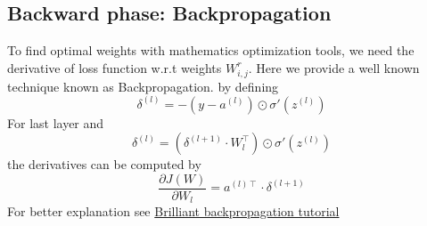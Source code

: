 \documentclass[10pt]{SelfArx} %
\begin{document}
	\subsection{Backward phase: Backpropagation}
	To find optimal weights with mathematics optimization tools, we need the derivative of loss function w.r.t weights $W_{i,j}^r$. Here we provide a well known technique known as Backpropagation.
	by defining
	\begin{equation}
	\delta^{(l)} = -(y - a^{(l)})\odot\sigma'(z^{(l)})
	\end{equation}
	For last layer and 
	\begin{equation}
	\delta^{(l)} = (\delta^{(l + 1)} \cdot W_{l}^{\intercal})\odot\sigma'(z^{(l)})
	\end{equation}
	the derivatives can be computed by
	\begin{equation}
	\displaystyle\frac{\partial J(W)}{\partial W_{l}} = a^{(l)\intercal} \cdot \delta^{(l + 1)}
	\end{equation}
	For better explanation see \href{https://brilliant.org/wiki/backpropagation/}{Brilliant backpropagation tutorial}
	
\end{document}
